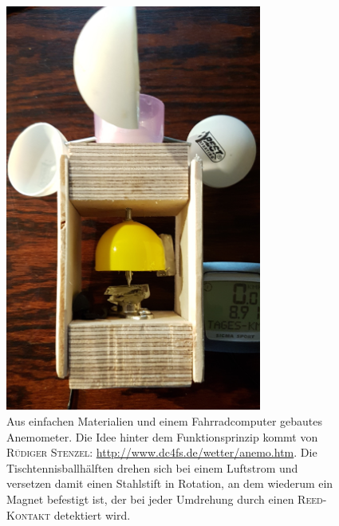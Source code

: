 \begin{figure}[htbp]
\vspace*{0.2cm}
\centering
 \includegraphics[width=0.75\textwidth]{images/Windkraft.jpg}
  \caption[Selbstbau eines Anemometers]{Aus einfachen Materialien und einem Fahrradcomputer gebautes Anemometer. Die Idee hinter dem Funktionsprinzip kommt von \textsc{Rüdiger Stenzel}: \url{http://www.dc4fs.de/wetter/anemo.htm}. Die Tischtennisballhälften drehen sich bei einem Luftstrom und versetzen damit einen Stahlstift in Rotation, an dem wiederum ein Magnet befestigt ist, der bei jeder Umdrehung durch einen \textsc{Reed-Kontakt} detektiert wird.}
  \label{fig:windgeschw1}
  \vspace{-0pt}
\end{figure}